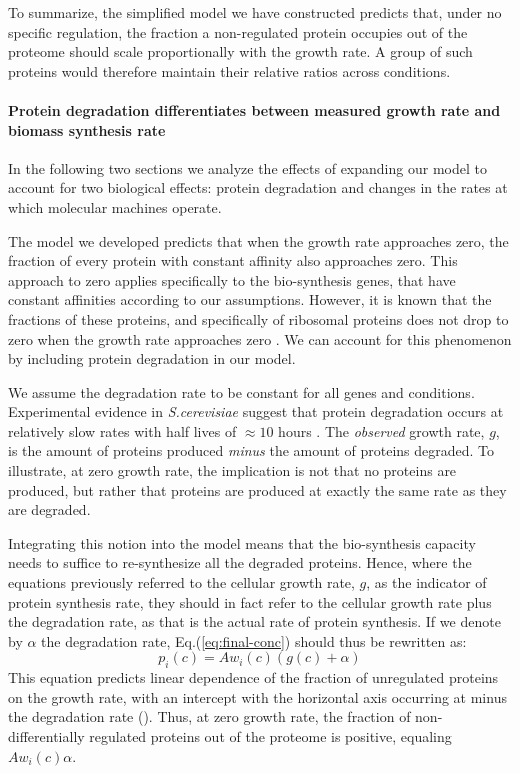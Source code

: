 \documentclass[10pt,letterpaper]{article}
\begin{document}
To summarize, the simplified model we have constructed predicts that, under no specific regulation, the fraction a non-regulated protein occupies out of the proteome should scale proportionally with the growth rate.
A group of such proteins would therefore maintain their relative ratios across conditions.

\paragraph{Protein degradation differentiates between measured growth rate and biomass synthesis rate}

In the following two sections we analyze the effects of expanding our model to account for two biological effects: protein degradation and changes in the rates at which molecular machines operate.

The model we developed predicts that when the growth rate approaches zero, the fraction of every protein with constant affinity also approaches zero.
This approach to zero applies specifically to the bio-synthesis genes, that have constant affinities according to our assumptions.
However, it is known that the fractions of these proteins, and specifically of ribosomal proteins does not drop to zero when the growth rate approaches zero \cite{ingraham1983growth,Pedersen1978a}.
We can account for this phenomenon by including protein degradation in our model.

We assume the degradation rate to be constant for all genes and conditions.
Experimental evidence in \emph{S.cerevisiae} suggest that protein degradation occurs at relatively slow rates with half lives of $\approx10$ hours \cite{Christiano2014}.
The \emph{observed} growth rate, $g$, is the amount of proteins produced \emph{minus} the amount of proteins degraded.
To illustrate, at zero growth rate, the implication is not that no proteins are produced, but rather that proteins are produced at exactly the same rate as they are degraded.

Integrating this notion into the model means that the bio-synthesis capacity needs to suffice to re-synthesize all the degraded proteins.
Hence, where the equations previously referred to the cellular growth rate, $g$, as the indicator of protein synthesis rate, they should in fact refer to the cellular growth rate plus the degradation rate, as that is the actual rate of protein synthesis.
If we denote by $\alpha$ the degradation rate, Eq.(\ref{eq:final-conc}) should thus be rewritten as:
\begin{equation}
  \label{eq:final-conc-deg}
  p_i(c)=Aw_i(c)(g(c)+\alpha)
\end{equation}
This equation predicts linear dependence of the fraction of unregulated proteins on the growth rate, with an intercept with the horizontal axis occurring at minus the degradation rate ().
Thus, at zero growth rate, the fraction of non-differentially regulated proteins out of the proteome is positive, equaling $Aw_i(c)\alpha$.
\end{document}
